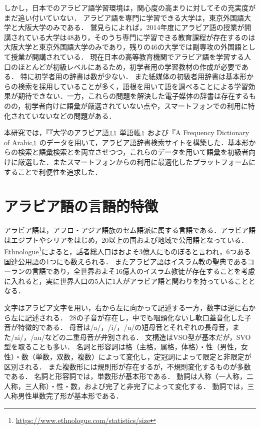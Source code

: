 \documentclass[technicalreport]{ieicej}
\begin{document}
しかし，日本でのアラビア語学習環境は，関心度の高まりに対してその充実度がまだ追い付いていない．
アラビア語を専門に学習できる大学は，東京外国語大学と大阪大学のみである．
鷲見\cite{washimi2016}らによれば，2014年度にアラビア語の授業が開講されている大学は48あり，そのうち専門に学習できる教育課程が存在するのは大阪大学と東京外国語大学のみであり，残りの46の大学では副専攻の外国語として授業が開講されている．
現在日本の高等教育機関でアラビア語を学習する人口のほとんどが初級レベルにあるため，初学者用の学習教材の作成が必要である．
特に初学者用の辞書は数が少ない．
また紙媒体の初級者用辞書は基本形からの検索を採用していることが多く，語根を用いて語を調べることによる学習効果が期待できない．一方，これらの問題を解決した電子媒体の辞書は存在するものの，初学者向けに語彙が厳選されていない点や，スマートフォンでの利用に特化されていないなどの問題がある．

本研究では，『『大学のアラビア語』』単語帳』および『A Frequency Dictionary of Arabic』のデータを用いて，アラビア語辞書検索サイトを構築した．基本形からの検索と語彙検索とを両立させつつ，これらのデータを用いて語彙を初級者向けに厳選した．またスマートフォンからの利用に最適化したプラットフォームにすることで利便性を追求した．

\section{アラビア語の言語的特徴}
アラビア語は，アフロ・アジア語族のセム語派に属する言語である．アラビア語はエジプトやシリアをはじめ，20以上の国および地域で公用語となっている．
Ethnologue\footnote{\url{https://www.ethnologue.com/statistics/size}}によると，話者総人口はおよそ3億人にものぼると言われ，6つある国連公用語の1つにも数えられる．
またアラビア語はイスラム教の聖典であるコーランの言語であり，全世界およそ16億人のイスラム教徒が存在することを考慮に入れると，実に世界人口の5人に1人がアラビア語と関わりを持っていることとなる．

文字はアラビア文字を用い，右から左に向かって記述する一方，数字は逆に右から左に記述される．
28の子音が存在し，中でも咽頭化ないし軟口蓋音化した子音が特徴的である．
母音は/a/，/i/，/u/の短母音とそれぞれの長母音，また/ai/，/au/などの二重母音が弁別される．
文構造はVSO型が基本だが，SVO型を取ることも多い．
名詞と形容詞は格（主格，属格，体格）・性（男性，女性）・数（単数，双数，複数）によって変化し，定冠詞によって限定と非限定が区別される．
また複数形には規則形が存在するが，不規則変化するものが多数である．
名詞と形容詞では，単数形が基本形である．
動詞は人称（一人称，二人称，三人称）・性・数，および完了と非完了によって変化する．
動詞では，三人称男性単数完了形が基本形である．
\end{document}
